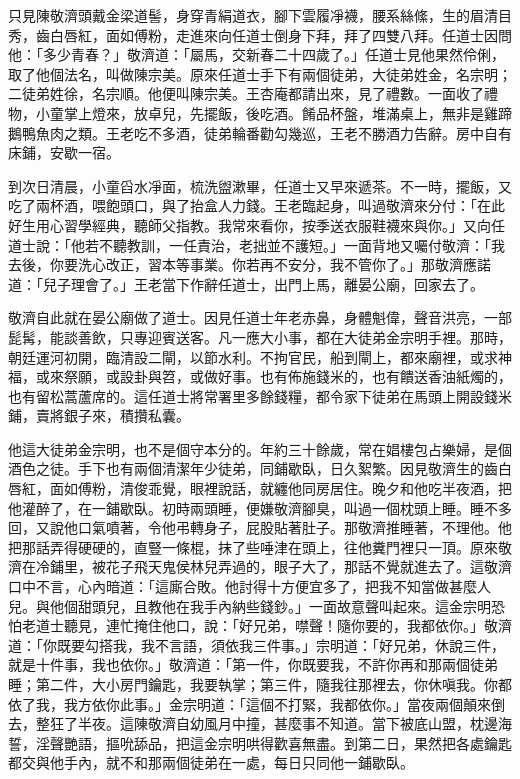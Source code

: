 只見陳敬濟頭戴金梁道髻，身穿青絹道衣，腳下雲履凈襪，腰系絲絛，生的眉清目秀，齒白唇紅，面如傅粉，走進來向任道士倒身下拜，拜了四雙八拜。任道士因問他：「多少青春？」敬濟道：「屬馬，交新春二十四歲了。」任道士見他果然伶俐，取了他個法名，叫做陳宗美。原來任道士手下有兩個徒弟，大徒弟姓金，名宗明；二徒弟姓徐，名宗順。他便叫陳宗美。王杏庵都請出來，見了禮數。一面收了禮物，小童掌上燈來，放卓兒，先擺飯，後吃酒。餚品杯盤，堆滿桌上，無非是雞蹄鵝鴨魚肉之類。王老吃不多酒，徒弟輪番勸勾幾巡，王老不勝酒力告辭。房中自有床鋪，安歇一宿。

到次日清晨，小童舀水凈面，梳洗盥漱畢，任道士又早來遞茶。不一時，擺飯，又吃了兩杯酒，喂飽頭口，與了抬盒人力錢。王老臨起身，叫過敬濟來分付：「在此好生用心習學經典，聽師父指教。我常來看你，按季送衣服鞋襪來與你。」又向任道士說：「他若不聽教訓，一任責治，老拙並不護短。」一面背地又囑付敬濟：「我去後，你要洗心改正，習本等事業。你若再不安分，我不管你了。」那敬濟應諾道：「兒子理會了。」王老當下作辭任道士，出門上馬，離晏公廟，回家去了。

敬濟自此就在晏公廟做了道士。因見任道士年老赤鼻，身體魁偉，聲音洪亮，一部髭髯，能談善飲，只專迎賓送客。凡一應大小事，都在大徒弟金宗明手裡。那時，朝廷運河初開，臨清設二閘，以節水利。不拘官民，船到閘上，都來廟裡，或求神福，或來祭願，或設卦與笤，或做好事。也有佈施錢米的，也有饋送香油紙燭的，也有留松蒿蘆席的。這任道士將常署里多餘錢糧，都令家下徒弟在馬頭上開設錢米鋪，賣將銀子來，積攢私囊。

他這大徒弟金宗明，也不是個守本分的。年約三十餘歲，常在娼樓包占樂婦，是個酒色之徒。手下也有兩個清潔年少徒弟，同鋪歇臥，日久絮繁。因見敬濟生的齒白唇紅，面如傅粉，清俊乖覺，眼裡說話，就纏他同房居住。晚夕和他吃半夜酒，把他灌醉了，在一鋪歇臥。初時兩頭睡，便嫌敬濟腳臭，叫過一個枕頭上睡。睡不多回，又說他口氣噴著，令他弔轉身子，屁股貼著肚子。那敬濟推睡著，不理他。他把那話弄得硬硬的，直豎一條棍，抹了些唾津在頭上，往他糞門裡只一頂。原來敬濟在冷鋪里，被花子飛天鬼侯林兒弄過的，眼子大了，那話不覺就進去了。這敬濟口中不言，心內暗道：「這廝合敗。他討得十方便宜多了，把我不知當做甚麼人兒。與他個甜頭兒，且教他在我手內納些錢鈔。」一面故意聲叫起來。這金宗明恐怕老道士聽見，連忙掩住他口，說：「好兄弟，噤聲！隨你要的，我都依你。」敬濟道：「你既要勾搭我，我不言語，須依我三件事。」宗明道：「好兄弟，休說三件，就是十件事，我也依你。」敬濟道：「第一件，你既要我，不許你再和那兩個徒弟睡；第二件，大小房門鑰匙，我要執掌；第三件，隨我往那裡去，你休嗔我。你都依了我，我方依你此事。」金宗明道：「這個不打緊，我都依你。」當夜兩個顛來倒去，整狂了半夜。這陳敬濟自幼風月中撞，甚麼事不知道。當下被底山盟，枕邊海誓，淫聲艷語，摳吮舔品，把這金宗明哄得歡喜無盡。到第二日，果然把各處鑰匙都交與他手內，就不和那兩個徒弟在一處，每日只同他一鋪歇臥。

